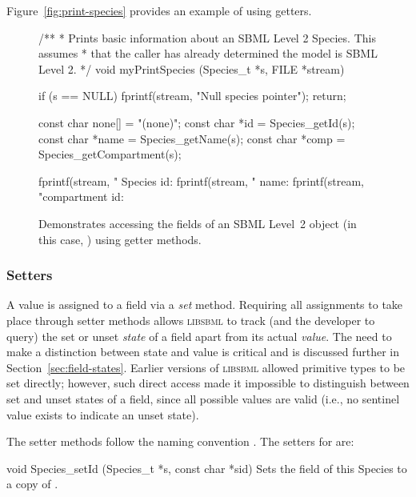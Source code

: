 \documentclass{sbmlmanual}
\newcommand{\libsbml}{\textsc{libsbml}}
\begin{document}
Figure~\vref{fig:print-species} provides an example of using getters. 

\begin{figure}[thb]
  \begin{codeVerbatim}[C,flexiblecolumns=false]
/**
 * Prints basic information about an SBML Level 2 Species.  This assumes
 * that the caller has already determined the model is SBML Level 2.
 */
void
myPrintSpecies (Species_t *s, FILE *stream)
{
  if (s == NULL)
  {
    fprintf(stream, "Null species pointer\n");
    return;
  }

  const char none[] = "(none)";
  const char *id = Species_getId(s);
  const char *name = Species_getName(s);
  const char *comp = Species_getCompartment(s);

  fprintf(stream, "    Species id: %
  fprintf(stream, "          name: %
  fprintf(stream, "compartment id: %
}
  \end{codeVerbatim}
  \caption{Demonstrates accessing the fields of an SBML Level~2 object
  (in this case, ) using getter methods.}
  \label{fig:print-species}
\end{figure}


\subsubsection{Setters}

A value is assigned to a field via a \emph{set} method.  Requiring all
assignments to take place through setter methods allows \libsbml{} to track
(and the developer to query) the set or unset \emph{state} of a field apart
from its actual \emph{value}.  The need to make a distinction between state
and value is critical and is discussed further in
Section~\ref{sec:field-states}.  Earlier versions of \libsbml{} allowed
primitive types to be set directly; however, such direct access made it
impossible to distinguish between set and unset states of a field, since
all possible values are valid (i.e., no sentinel value exists to indicate
an unset state).

The setter methods follow the naming convention .
The setters for  are:


\begin{methoddef}{void Species\_setId (Species\_t *s, const char *sid)}
  Sets the  field of this Species to a copy of .
\end{methoddef}
\end{document}

